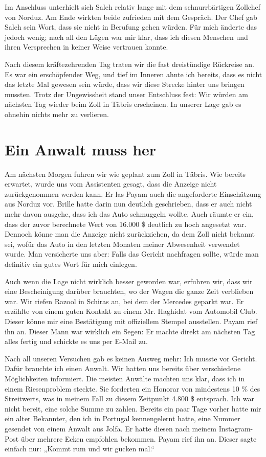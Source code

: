 Im Anschluss unterhielt sich Saleh relativ lange mit dem schnurrbärtigen Zollchef von Norduz. Am Ende wirkten beide zufrieden mit dem Gespräch. Der Chef gab Saleh sein Wort, dass sie nicht in Berufung gehen würden. Für mich änderte das jedoch wenig; nach all den Lügen war mir klar, dass ich diesen Menschen und ihren Versprechen in keiner Weise vertrauen konnte.

Nach diesem kräftezehrenden Tag traten wir die fast dreistündige Rückreise an. Es war ein erschöpfender Weg, und tief im Inneren ahnte ich bereits, dass es nicht das letzte Mal gewesen sein würde, dass wir diese Strecke hinter uns bringen mussten. Trotz der Ungewissheit stand unser Entschluss fest: Wir würden am nächsten Tag wieder beim Zoll in Täbris erscheinen. In unserer Lage gab es ohnehin nichts mehr zu verlieren.

\chapter*{Ein Anwalt muss her}

Am nächsten Morgen fuhren wir wie geplant zum Zoll in Täbris. Wie bereits erwartet, wurde uns vom Assistenten gesagt, dass die Anzeige nicht zurückgenommen werden kann. Er las Payam auch die angeforderte Einschätzung aus Norduz vor. Brille hatte darin nun deutlich geschrieben, dass er auch nicht mehr davon ausgehe, dass ich das Auto schmuggeln wollte. Auch räumte er ein, dass der zuvor berechnete Wert von 16.000 \$ deutlich zu hoch angesetzt war. Dennoch könne man die Anzeige nicht zurückziehen, da dem Zoll nicht bekannt sei, wofür das Auto in den letzten Monaten meiner Abwesenheit verwendet wurde. Man versicherte uns aber: Falls das Gericht nachfragen sollte, würde man definitiv ein gutes Wort für mich einlegen.

Auch wenn die Lage nicht wirklich besser geworden war, erfuhren wir, dass wir eine Bescheinigung darüber brauchten, wo der Wagen die ganze Zeit verblieben war. Wir riefen Razool in Schiras an, bei dem der Mercedes geparkt war. Er erzählte von einem guten Kontakt zu einem Mr. Haghidat vom Automobil Club. Dieser könne mir eine Bestätigung mit offiziellem Stempel ausstellen. Payam rief ihn an. Dieser Mann war wirklich ein Segen: Er machte direkt am nächsten Tag alles fertig und schickte es uns per E-Mail zu.

Nach all unseren Versuchen gab es keinen Ausweg mehr: Ich musste vor Gericht. Dafür brauchte ich einen Anwalt. Wir hatten uns bereits über verschiedene Möglichkeiten informiert. Die meisten Anwälte machten uns klar, dass ich in einem Riesenproblem steckte. Sie forderten ein Honorar von mindestens 10 \% des Streitwerts, was in meinem Fall zu diesem Zeitpunkt 4.800 \$ entsprach. Ich war nicht bereit, eine solche Summe zu zahlen. Bereits ein paar Tage vorher hatte mir ein alter Bekannter, den ich in Portugal kennengelernt hatte, eine Nummer gesendet von einem Anwalt aus Jolfa. Er hatte diesen nach meinem Instagram-Post über mehrere Ecken empfohlen bekommen. Payam rief ihn an. Dieser sagte einfach nur: „Kommt rum und wir gucken mal.“

